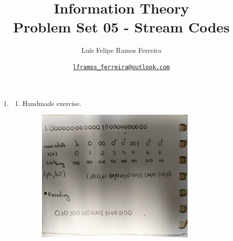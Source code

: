 \documentclass{article}
\title{Information Theory \\ \large Problem Set 05 - Stream Codes}
\author{Luís Felipe Ramos Ferreira}
\date{\href{mailto:lframos\_ferreira@outlook.com}{\texttt{lframos\_ferreira@outlook.com}}
}
\begin{document}
\maketitle

\begin{enumerate}
	\item \begin{enumerate}
		      \item Handmade exercise.
		            \begin{figure}[H]
			            \centering
			            \includegraphics[width=0.8\textwidth]{images/5-1-a.jpeg}
		            \end{figure}


\end{enumerate}
\end{enumerate}
\end{document}
